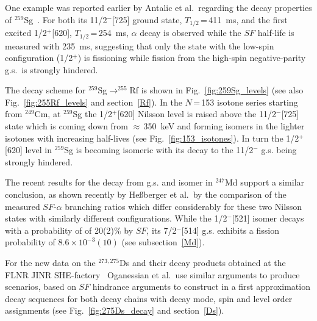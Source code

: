 One example was reported earlier by Antalic et al.~regarding the decay properties of $^{259}$Sg~\cite{Antalic2015}.
For both its 11/2$^-$[725] ground state, $T_{1/2}$\,=\,411~ms, and the first excited 1/2$^+$[620], $T_{1/2}$\,=\,254~ms, $\alpha$ decay is observed while the $SF$ half-life is measured with 235~ms, suggesting that only the state with the low-spin configuration (1/2$^+$) is fissioning while fission from the high-spin negative-parity g.s.~is strongly hindered. 

The decay scheme for $^{259}$Sg$\longrightarrow^{255}$Rf is shown in Fig.~\ref{fig:259Sg_levels} (see also Fig.~\ref{fig:255Rf_levels} and section~\ref{Rf}). 
In the $N$\,=\,153 isotone series starting from $^{249}$Cm, at $^{259}$Sg the 1/2$^+$[620] Nilsson level is raised above the 11/2$^-$[725] state which is coming down from $\approx$\,350~keV and forming isomers in the lighter isotones with increasing half-lives (see Fig.~\ref{fig:153_isotones}). 
In turn the 1/2$^+$[620] level in $^{259}$Sg is becoming isomeric with its decay to the 11/2$^-$ g.s. being strongly hindered.

The recent results for the decay from g.s. and isomer in $^{247}$Md support a similar conclusion, as shown recently by He{\ss}berger et al.~by the comparison of the measured $SF$-$\alpha$ branching ratios which differ considerably for these two Nilsson states with similarly different configurations.
While the 1/2$^-$[521] isomer decays with a probability of of 20(2)\% by $SF$, its 7/2$^-$[514] g.s. exhibits a fission probability of $8.6\times10^{-3}(10)$ (see subsection~\ref{Md}).

For the new data on the $^{273,275}$Ds and their decay products obtained at the FLNR JINR SHE-factory~\cite{Oganessian2024} Oganessian et al.~use similar arguments to produce scenarios, based on $SF$ hindrance arguments to construct in a first approximation decay sequences for both decay chains with decay mode, spin and level order assignments (see Fig.~\ref{fig:275Ds_decay} and section~\ref{Ds}).


